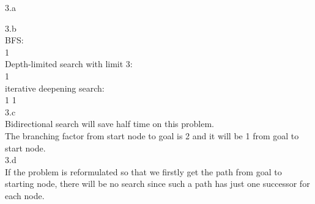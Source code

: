 \documentclass[a4paper]{article}
\begin{document}
3.a \\

3.b \\
BFS: \\
1        \textrightarrow {}     \\

Depth-limited search with limit 3:\\
1              \\

iterative deepening search:\\
1           1              \\

3.c \\
Bidirectional search will save half time on this problem. \\
The branching factor from start node to goal is 2 and it will be 1 from goal to start node.\\

3.d \\
If the problem is reformulated so that we firstly get the path from goal to starting node, there will be no search since such a path has just one successor for each node.\\
\end{document}

